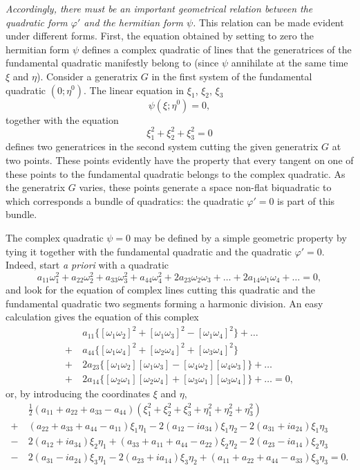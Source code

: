 \documentclass[leqno,12pt]{article}
\makeatletter
\let\old@phi\phi
\let\old@varphi\varphi
\let\phi\old@varphi
\let\varphi\old@phi
\theoremstyle{shape1}
\theoremstyle{shape0}
\theoremstyle{shape2}
\theoremstyle{definition}
\makeatother
\begin{document}
\emph{Accordingly, there must be an important geometrical relation between the quadratic form $\phi'$ and the hermitian form $\psi$.} This relation can be made evident under different forms. First, the equation obtained by setting to zero the hermitian form $\psi$ defines a complex quadratic of lines that the generatrices of the fundamental quadratic manifestly belong to (since $\psi$ annihilate at the same time $\xi$ and $\eta$). Consider a generatrix $G$ in the first system of the fundamental quadratic $(0;\eta^{0})$. The linear equation in $\xi_{1}$, $\xi_{2}$, $\xi_{3}$
\[
\psi(\xi;\eta^{0})=0,
\]
together with the equation
\[
\xi_{1}^{2}+\xi_{2}^{2}+\xi_{3}^{2}=0
\]
defines two generatrices in the second system cutting the given generatrix $G$ at two points. These points evidently have the property that every tangent on one of these points to the fundamental quadratic belongs to the complex quadratic. As the generatrix $G$ varies, these points generate a space non-flat biquadratic to which corresponds a bundle of quadratics: the quadratic $\phi'=0$ is part of this bundle.

The complex quadratic $\psi=0$ may be defined by a simple geometric property by tying it together with the fundamental quadratic and the quadratic $\phi'=0$. Indeed, start \emph{a priori} with a quadratic
\[
a_{11}\omega_{1}^{2}+a_{22}\omega_{2}^{2}+a_{33}\omega_{3}^{2}+a_{44}\omega_{4}^{2}+2a_{23}\omega_{2}\omega_{3}+\dots+2a_{14}\omega_{1}\omega_{4}+\dots=0,
\]
and look for the equation of complex lines cutting this quadratic and the fundamental quadratic two segments forming a harmonic division. An easy calculation gives the equation of this complex
\begin{align*}
  &\ a_{11}\{[\omega_{1}\omega_{2}]^{2}+[\omega_{1}\omega_{3}]^{2}-[\omega_{1}\omega_{4}]^{2}\}+\dots\\
+&\ a_{44}\{[\omega_{1}\omega_{4}]^{2}+[\omega_{2}\omega_{4}]^{2}+[\omega_{3}\omega_{4}]^{2}\}\\
+&\ 2a_{23}\{[\omega_{1}\omega_{2}][\omega_{1}\omega_{3}]-[\omega_{4}\omega_{2}][\omega_{4}\omega_{3}]\}+\dots\\
+&\ 2a_{14}\{[\omega_{2}\omega_{1}][\omega_{2}\omega_{4}]+[\omega_{3}\omega_{1}][\omega_{3}\omega_{4}]\}+\dots=0,
\end{align*}
or, by introducing the coordinates $\xi$ and $\eta$,
\begin{align*}
  &\ \frac{1}{2}(a_{11}+a_{22}+a_{33}-a_{44})(\xi_{1}^{2}+\xi_{2}^{2}+\xi_{3}^{2}+\eta_{1}^{2}+\eta_{2}^{2}+\eta_{3}^{2})\\
  +&\ (a_{22}+a_{33}+a_{44}-a_{11})\xi_{1}\eta_{1}-2(a_{12}-ia_{34})\xi_{1}\eta_{2}-2(a_{31}+ia_{24})\xi_{1}\eta_{3}\\
  -&\ 2(a_{12}+ia_{34})\xi_{2}\eta_{1}+(a_{33}+a_{11}+a_{44}-a_{22})\xi_{2}\eta_{2}-2(a_{23}-ia_{14})\xi_{2}\eta_{3}\\
  -&\ 2(a_{31}-ia_{24})\xi_{3}\eta_{1}-2(a_{23}+ia_{14})\xi_{3}\eta_{2}+(a_{11}+a_{22}+a_{44}-a_{33})\xi_{3}\eta_{3}=0.
\end{align*}
\end{document}
